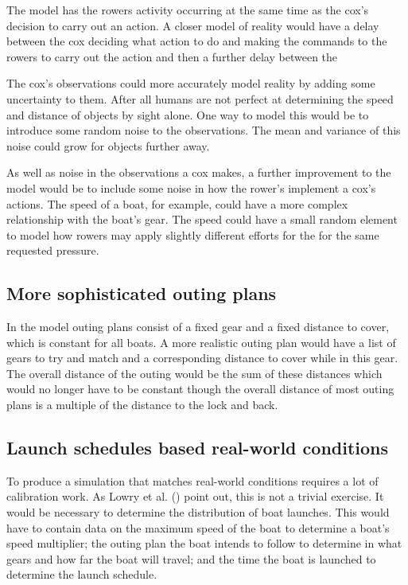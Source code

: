 The model has the rowers activity occurring at the same time as the cox's decision to carry out an action. A closer model of reality would have a delay between the cox deciding what action to do and making the commands to the rowers to carry out the action and then a further delay between the 

The cox's observations could more accurately model reality by adding some uncertainty to them. After all humans are not perfect at determining the speed and distance of objects by sight alone. One way to model this would be to introduce some random noise to the observations. The mean and variance of this noise could grow for objects further away.

As well as noise in the observations a cox makes, a further improvement to the model would be to include some noise in how the rower's implement a cox's actions. The speed of a boat, for example, could have a more complex relationship with the boat's gear. The speed could have a small random element to model how rowers may apply slightly different efforts for the for the same requested pressure.

\subsection{More sophisticated outing plans}

In the model outing plans consist of a fixed gear and a fixed distance to cover, which is constant for all boats. A more realistic outing plan would have a list of gears to try and match and a corresponding distance to cover while in this gear. The overall distance of the outing would be the sum of these distances which would no longer have to be constant though the overall distance of most outing plans is a multiple of the distance to the lock and back.

\subsection{Launch schedules based real-world conditions}\label{model:future:launch_schedule}

To produce a simulation that matches real-world conditions requires a lot of calibration work. As Lowry et al. (\cite{Lowry2011}) point out, this is not a trivial exercise. It would be necessary to determine the distribution of boat launches. This would have to contain data on the maximum speed of the boat to determine a boat's speed multiplier; the outing plan the boat intends to follow to determine in what gears and how far the boat will travel; and the time the boat is launched to determine the launch schedule.

